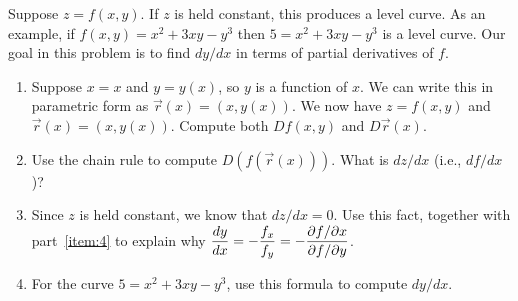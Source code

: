 \begin{problem}%
%
 Suppose $z=f(x,y)$.  If $z$ is held constant, this produces a level curve. As an example, if $f(x,y) = x^2+3xy-y^3$ then $5=x^2+3xy-y^3$ is a level curve. Our goal in this problem is to find $dy/dx$ in terms of partial derivatives of $f$.
\begin{enumerate}
 \item Suppose $x=x$ and $y=y(x)$, so $y$ is a function of $x$.  We can write this in parametric form as $\vec r(x) = (x,y(x))$. We now have $z=f(x,y)$ and $\vec r(x)=(x,y(x))$.  Compute both $Df(x,y)$ and $D\vec r(x)$. 
 \item\label{item:4} Use the chain rule to compute $D(f(\vec r(x)))$. What is $dz/dx$ (i.e., $df/dx$)?
 \item Since $z$ is held constant, we know that $dz/dx=0$. Use this fact, together with part~\ref{item:4} to explain why $\displaystyle \frac{dy}{dx} = -\frac{f_x}{f_y} = -\frac{\partial f/ \partial x}{\partial f/ \partial y}$.
 \item For the curve $5=x^2+3xy-y^3$, use this formula to compute $dy/dx$.
\end{enumerate}

\end{problem}

